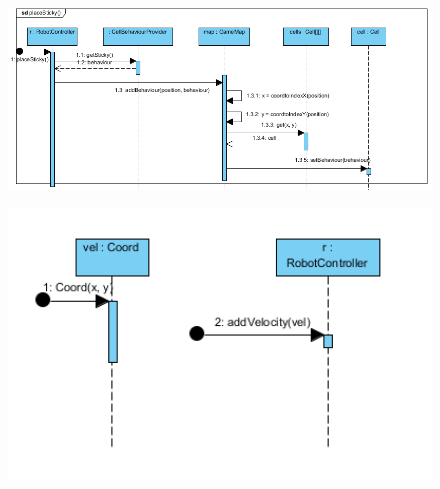 \begin{figure}[!htbp]
	\begin{center}
		\includegraphics[width=180mm, center]{./chapters/chapter03/sticky.png}
		\caption{}
	\end{center}
\end{figure}

\begin{figure}[!htbp]
	\begin{center}
		\includegraphics[width=180mm, center]{./chapters/chapter03/velocity.png}
		\caption{}
	\end{center}
\end{figure}

\clearpage


